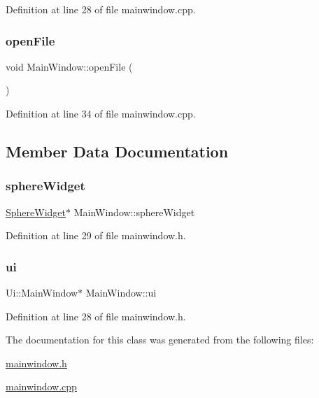 Definition at line 28 of file mainwindow.\+cpp.

\mbox{\label{class_main_window_a288b768c3c21a9171bdc56fe845ece8b}} 
\subsubsection{\texorpdfstring{open\+File}{openFile}}
{\footnotesize\ttfamily void Main\+Window\+::open\+File (\begin{DoxyParamCaption}{ }\end{DoxyParamCaption})\hspace{0.3cm}{\ttfamily [slot]}}



Definition at line 34 of file mainwindow.\+cpp.



\subsection{Member Data Documentation}
\mbox{\label{class_main_window_afc60f18ae3cf60a9c231d8344a5bbda8}} 
\subsubsection{\texorpdfstring{sphere\+Widget}{sphereWidget}}
{\footnotesize\ttfamily \hyperlink{class_sphere_widget}{Sphere\+Widget}$\ast$ Main\+Window\+::sphere\+Widget\hspace{0.3cm}{\ttfamily [private]}}



Definition at line 29 of file mainwindow.\+h.

\mbox{\label{class_main_window_a35466a70ed47252a0191168126a352a5}} 
\subsubsection{\texorpdfstring{ui}{ui}}
{\footnotesize\ttfamily Ui\+::\+Main\+Window$\ast$ Main\+Window\+::ui\hspace{0.3cm}{\ttfamily [private]}}



Definition at line 28 of file mainwindow.\+h.



The documentation for this class was generated from the following files\+:\begin{DoxyCompactItemize}
\item 
\hyperlink{mainwindow_8h}{mainwindow.\+h}\item 
\hyperlink{mainwindow_8cpp}{mainwindow.\+cpp}\end{DoxyCompactItemize}
